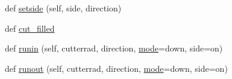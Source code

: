 \begin{DoxyCompactItemize}
\item 
def \hyperlink{classpath_1_1_path_a4c5e4718eaa88771355d67dad27e2085}{setside} (self, side, direction)
\item 
def \hyperlink{classpath_1_1_path_a8019b817dfbe1008d6d62275012404cf}{cut\+\_\+filled}
\item 
def \hyperlink{classpath_1_1_path_a8bb4181cb5b7df33af8ded807dcda821}{runin} (self, cutterrad, direction, \hyperlink{classpath_1_1_path_ab4089a2e9ac6e1b0539f194a572f4960}{mode}=\textquotesingle{}down\textquotesingle{}, side=\textquotesingle{}on\textquotesingle{})
\item 
def \hyperlink{classpath_1_1_path_a3347f14afca8697534ed8585f5ded174}{runout} (self, cutterrad, direction, \hyperlink{classpath_1_1_path_ab4089a2e9ac6e1b0539f194a572f4960}{mode}=\textquotesingle{}down\textquotesingle{}, side=\textquotesingle{}on\textquotesingle{})
\end{DoxyCompactItemize}
